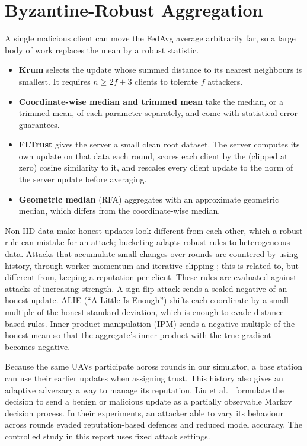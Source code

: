 \section{Byzantine-Robust Aggregation}
A single malicious client can move the FedAvg average arbitrarily far, so a large
body of work replaces the mean by a robust statistic.
\begin{itemize}
\item \textbf{Krum} \cite{blanchard2017krum} selects the update whose summed distance
  to its nearest neighbours is smallest. It requires $n\ge 2f+3$ clients to tolerate
  $f$ attackers.
\item \textbf{Coordinate-wise median and trimmed mean} \cite{yin2018median} take the
  median, or a trimmed mean, of each parameter separately, and come with statistical
  error guarantees.
\item \textbf{FLTrust} \cite{cao2021fltrust} gives the server a small clean root
  dataset. The server computes its own update on that data each round, scores each
  client by the (clipped at zero) cosine similarity to it, and rescales every client
  update to the norm of the server update before averaging.
\item \textbf{Geometric median} (RFA) \cite{pillutla2022rfa} aggregates with an
  approximate geometric median, which differs from the coordinate-wise median.
\end{itemize}
Non-IID data make honest updates look different from each other, which a robust rule
can mistake for an attack; bucketing \cite{karimireddy2022bucketing} adapts robust
rules to heterogeneous data. Attacks that accumulate small changes over rounds are
countered by using history, through worker momentum and iterative clipping
\cite{karimireddy2021history}; this is related to, but different from, keeping a
reputation per client.
These rules are evaluated against attacks of increasing strength. A sign-flip attack
sends a scaled negative of an honest update. ALIE (``A Little Is Enough'')
\cite{baruch2019alie} shifts each coordinate by a small multiple of the honest
standard deviation, which is enough to evade distance-based rules. Inner-product
manipulation (IPM) \cite{xie2019ipm} sends a negative multiple of the honest mean so
that the aggregate's inner product with the true gradient becomes negative.

Because the same UAVs participate across rounds in our simulator, a base station
can use their earlier updates when assigning trust. This history also gives an
adaptive adversary a way to manage its reputation. Liu et al.~\cite{liu2026evade}
formulate the decision to send a benign or malicious update as a partially
observable Markov decision process. In their experiments, an attacker able to
vary its behaviour across rounds evaded reputation-based defences and reduced
model accuracy. The controlled study in this report uses fixed attack settings.

